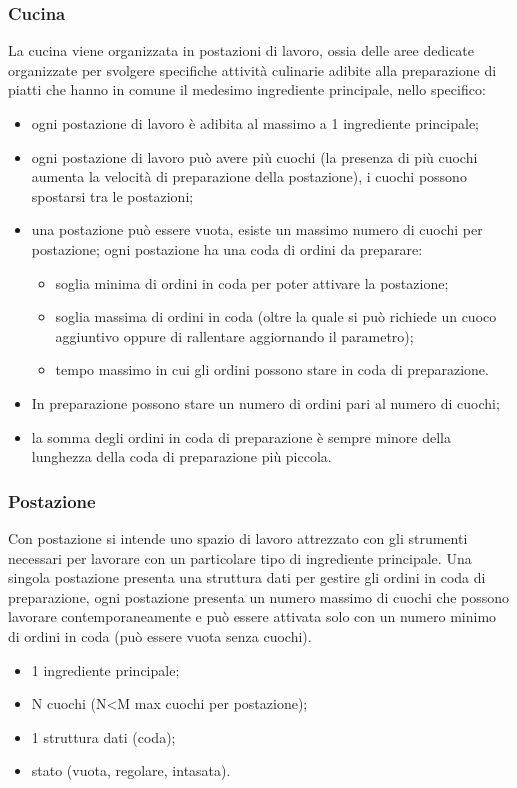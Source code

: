 \subsubsection{Cucina}
La cucina viene organizzata in postazioni di lavoro, ossia delle aree dedicate organizzate per svolgere specifiche attività culinarie adibite alla preparazione di piatti che hanno in comune il medesimo ingrediente principale, nello specifico:
\begin{itemize}
	\item ogni postazione di lavoro è adibita al massimo a 1 ingrediente principale;
	\item ogni postazione di lavoro può avere più cuochi (la presenza di più cuochi aumenta la velocità di preparazione della postazione), i cuochi possono spostarsi tra le postazioni;
	\item una postazione può essere vuota, esiste un massimo numero di cuochi per postazione;
	ogni postazione ha una coda di ordini da preparare:
	\begin{itemize}
		\item soglia minima di ordini in coda per poter attivare la postazione;
		\item soglia massima di ordini in coda (oltre la quale si può richiede un cuoco aggiuntivo oppure di rallentare aggiornando il parametro);
		\item tempo massimo in cui gli ordini possono stare in coda di preparazione.
	\end{itemize}
	\item In preparazione possono stare un numero di ordini pari al numero di cuochi;
	\item la somma degli ordini in coda di preparazione è sempre minore della lunghezza della coda di preparazione più piccola.
\end{itemize}

\subsubsection{Postazione}
Con postazione si intende uno spazio di lavoro attrezzato con gli strumenti necessari per lavorare con un particolare tipo di ingrediente principale. Una singola postazione presenta una struttura dati per gestire gli ordini in coda di preparazione, ogni postazione presenta un numero massimo di cuochi che possono lavorare contemporaneamente e può essere attivata solo con un numero minimo di ordini in coda (può essere vuota senza cuochi).
\begin{itemize}
	\item 1 ingrediente principale;
	\item N cuochi (N<M max cuochi per postazione);
	\item 1 struttura dati (coda);
	\item stato (vuota, regolare, intasata).
\end{itemize}


